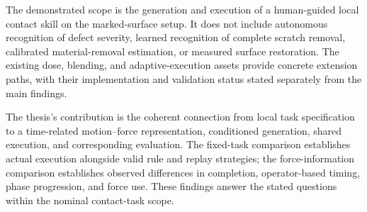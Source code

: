 The demonstrated scope is the generation and execution of a human-guided local contact skill on the marked-surface setup. It does not include autonomous recognition of defect severity, learned recognition of complete scratch removal, calibrated material-removal estimation, or measured surface restoration. The existing dose, blending, and adaptive-execution assets provide concrete extension paths, with their implementation and validation status stated separately from the main findings.

The thesis's contribution is the coherent connection from local task specification to a time-related motion--force representation, conditioned generation, shared execution, and corresponding evaluation. The fixed-task comparison establishes actual execution alongside valid rule and replay strategies; the force-information comparison establishes observed differences in completion, operator-based timing, phase progression, and force use. These findings answer the stated questions within the nominal contact-task scope.
